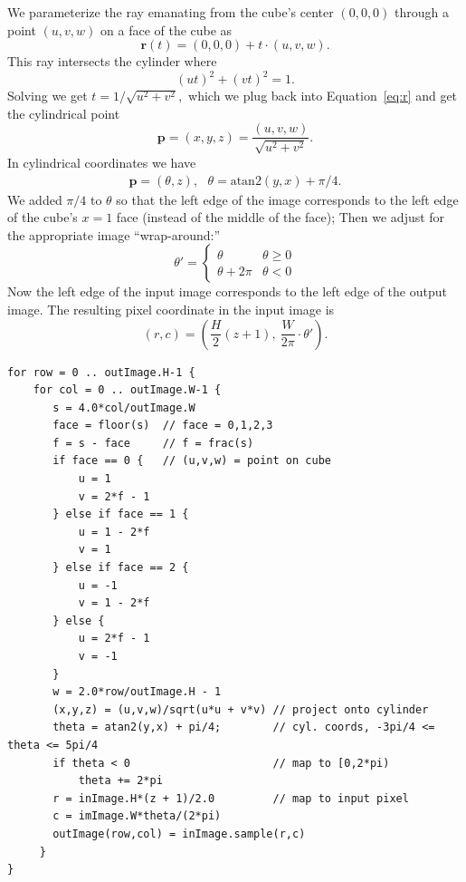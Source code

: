 \documentclass[11pt, oneside]{article}   	%
\begin{document}
We parameterize the ray emanating from 
the cube's center $(0,0,0)$ through a point $(u,v,w)$ on a face of the cube as
\begin{equation}
  \mathbf{r}(t) = (0,0,0) + t\cdot(u,v,w). \label{eq:r}
\end{equation}
This ray intersects the cylinder where
\begin{equation}
  (ut)^2 + (vt)^2 = 1.
\end{equation}
Solving we get $t = 1/\sqrt{u^2 + v^2},$ which we plug back into Equation~\ref{eq:r} and
get the cylindrical point
\begin{equation}
  \mathbf{p} = (x,y,z) = \frac{(u,v,w)}{\sqrt{u^2 + v^2}}.
\end{equation}
In cylindrical coordinates we have
\begin{eqnarray}
\mathbf{p} = \left(\theta, z\right), \ \ \ 
  \theta = \mbox{atan2}\left(y,x\right) + \pi/4. \label{eq:theta}
\end{eqnarray}
We added $\pi/4$ to $\theta$ so that the left edge of the image corresponds to
the left edge of the cube's $x = 1$ face (instead of the middle of the face);
Then we adjust for the appropriate image ``wrap-around:''
\begin{equation}
\theta' = \left\{\begin{array}{ll}
  \theta        & \theta \geq 0 \\
  \theta + 2\pi & \theta < 0
  \end{array}\right.
\end{equation}
Now the left edge of the input image corresponds to the left edge of the output image.
The resulting pixel coordinate in the input image is
\begin{equation}
(r,c) = \left(\frac{H}{2}\left(z + 1\right),\ \frac{W}{2\pi}\cdot \theta'\right).
\end{equation}




\begin{verbatim}
for row = 0 .. outImage.H-1 {
    for col = 0 .. outImage.W-1 {
       s = 4.0*col/outImage.W
       face = floor(s)  // face = 0,1,2,3
       f = s - face     // f = frac(s)
       if face == 0 {   // (u,v,w) = point on cube
           u = 1
           v = 2*f - 1
       } else if face == 1 {
           u = 1 - 2*f
           v = 1
       } else if face == 2 {
           u = -1
           v = 1 - 2*f
       } else {
           u = 2*f - 1
           v = -1
       }
       w = 2.0*row/outImage.H - 1
       (x,y,z) = (u,v,w)/sqrt(u*u + v*v) // project onto cylinder
       theta = atan2(y,x) + pi/4;        // cyl. coords, -3pi/4 <= theta <= 5pi/4
       if theta < 0                      // map to [0,2*pi)
           theta += 2*pi
       r = inImage.H*(z + 1)/2.0         // map to input pixel
       c = imImage.W*theta/(2*pi)
       outImage(row,col) = inImage.sample(r,c)
     }
}
\end{verbatim}


\end{document}
